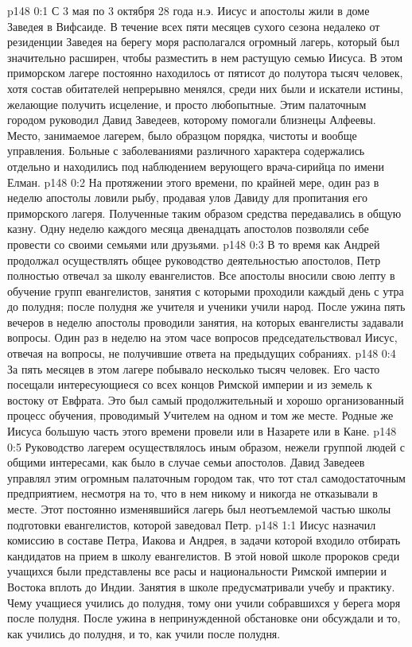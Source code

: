 \vs p148 0:1 С 3 мая по 3 октября 28 года н.э. Иисус и апостолы жили в доме Заведея в Вифсаиде. В течение всех пяти месяцев сухого сезона недалеко от резиденции Заведея на берегу моря располагался огромный лагерь, который был значительно расширен, чтобы разместить в нем растущую семью Иисуса. В этом приморском лагере постоянно находилось от пятисот до полутора тысяч человек, хотя состав обитателей непрерывно менялся, среди них были и искатели истины, желающие получить исцеление, и просто любопытные. Этим палаточным городом руководил Давид Заведеев, которому помогали близнецы Алфеевы. Место, занимаемое лагерем, было образцом порядка, чистоты и вообще управления. Больные с заболеваниями различного характера содержались отдельно и находились под наблюдением верующего врача\hyp{}сирийца по имени Елман.
\vs p148 0:2 На протяжении этого времени, по крайней мере, один раз в неделю апостолы ловили рыбу, продавая улов Давиду для пропитания его приморского лагеря. Полученные таким образом средства передавались в общую казну. Одну неделю каждого месяца двенадцать апостолов позволяли себе провести со своими семьями или друзьями.
\vs p148 0:3 В то время как Андрей продолжал осуществлять общее руководство деятельностью апостолов, Петр полностью отвечал за школу евангелистов. Все апостолы вносили свою лепту в обучение групп евангелистов, занятия с которыми проходили каждый день с утра до полудня; после полудня же учителя и ученики учили народ. После ужина пять вечеров в неделю апостолы проводили занятия, на которых евангелисты задавали вопросы. Один раз в неделю на этом часе вопросов председательствовал Иисус, отвечая на вопросы, не получившие ответа на предыдущих собраниях.
\vs p148 0:4 За пять месяцев в этом лагере побывало несколько тысяч человек. Его часто посещали интересующиеся со всех концов Римской империи и из земель к востоку от Евфрата. Это был самый продолжительный и хорошо организованный процесс обучения, проводимый Учителем на одном и том же месте. Родные же Иисуса большую часть этого времени провели или в Назарете или в Кане.
\vs p148 0:5 Руководство лагерем осуществлялось иным образом, нежели группой людей с общими интересами, как было в случае семьи апостолов. Давид Заведеев управлял этим огромным палаточным городом так, что тот стал самодостаточным предприятием, несмотря на то, что в нем никому и никогда не отказывали в месте. Этот постоянно изменявшийся лагерь был неотъемлемой частью школы подготовки евангелистов, которой заведовал Петр.
\vs p148 1:1 Иисус назначил комиссию в составе Петра, Иакова и Андрея, в задачи которой входило отбирать кандидатов на прием в школу евангелистов. В этой новой школе пророков среди учащихся были представлены все расы и национальности Римской империи и Востока вплоть до Индии. Занятия в школе предусматривали учебу и практику. Чему учащиеся учились до полудня, тому они учили собравшихся у берега моря после полудня. После ужина в непринужденной обстановке они обсуждали и то, как учились до полудня, и то, как учили после полудня.
